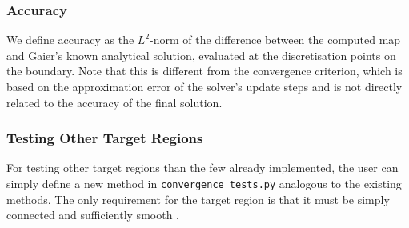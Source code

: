 \subsubsection{Accuracy} \label{chap:accuracy}
We define accuracy as the $L^2$-norm of the difference between the computed map and Gaier's known analytical solution, evaluated at the discretisation points on the boundary. Note that this is different from the convergence criterion, which is based on the approximation error of the solver's update steps and is not directly related to the accuracy of the final solution.

\subsubsection{Testing Other Target Regions}
For testing other target regions than the few already implemented, the user can simply define a new method in \texttt{convergence\_tests.py} analogous to the existing methods. The only requirement for the target region is that it must be simply connected and sufficiently smooth \cite[Theorem 1]{Wegmann1984_convergence_iterative_method}.